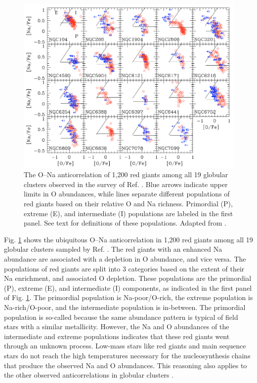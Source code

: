 \begin{figure}[t]
\centering
\includegraphics[width=6.5in]{Chapter-1/figs/O-Na.png}
\caption{\label{fig:O-Na}The O--Na anticorrelation of 1,200 red giants among all 19 globular clusters observed in the survey of Ref. \cite{Carretta2010}. Blue arrows indicate upper limits in O abundances, while lines separate different populations of red giants based on their relative O and Na richness. Primordial (P), extreme (E), and intermediate (I) populations are labeled in the first panel. See text for definitions of these populations. Adapted from \cite{Carretta2010}.}
\end{figure}

Fig. \ref{fig:O-Na} shows the ubiquitous O--Na anticorrelation in 1,200 red giants among all 19 globular clusters sampled by Ref. \cite{Carretta2010}. The red giants with an enhanced Na abundance are associated with a depletion in O abundance, and vice versa. The populations of red giants are split into 3 categories based on the extent of their Na enrichment, and associated O depletion. These populations are the primordial (P), extreme (E), and intermediate (I) components, as indicated in the first panel of Fig. \ref{fig:O-Na}. The primordial population is Na-poor/O-rich, the extreme population is Na-rich/O-poor, and the intermediate population is in-between. The primordial population is so-called because the same abundance pattern is typical of field stars with a similar metallicity. However, the Na and O abundances of the intermediate and extreme populations indicates that these red giants went through an unknown process. Low-mass stars like red giants and main sequence stars do not reach the high temperatures necessary for the nucleosynthesis chains that produce the observed Na and O abundances. This reasoning also applies to the other observed anticorrelations in globular clusters \cite{Prantzos2007}.

